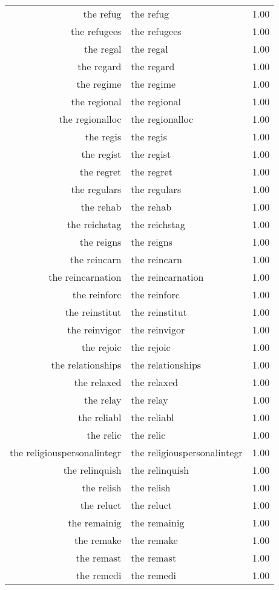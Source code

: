 \begin{table}[ht]
\begin{tabular}{rlr}
  the refug & the refug & 1.00 \\ 
  the refugees & the refugees & 1.00 \\ 
  the regal & the regal & 1.00 \\ 
  the regard & the regard & 1.00 \\ 
  the regime & the regime & 1.00 \\ 
  the regional & the regional & 1.00 \\ 
  the regionalloc & the regionalloc & 1.00 \\ 
  the regis & the regis & 1.00 \\ 
  the regist & the regist & 1.00 \\ 
  the regret & the regret & 1.00 \\ 
  the regulars & the regulars & 1.00 \\ 
  the rehab & the rehab & 1.00 \\ 
  the reichstag & the reichstag & 1.00 \\ 
  the reigns & the reigns & 1.00 \\ 
  the reincarn & the reincarn & 1.00 \\ 
  the reincarnation & the reincarnation & 1.00 \\ 
  the reinforc & the reinforc & 1.00 \\ 
  the reinstitut & the reinstitut & 1.00 \\ 
  the reinvigor & the reinvigor & 1.00 \\ 
  the rejoic & the rejoic & 1.00 \\ 
  the relationships & the relationships & 1.00 \\ 
  the relaxed & the relaxed & 1.00 \\ 
  the relay & the relay & 1.00 \\ 
  the reliabl & the reliabl & 1.00 \\ 
  the relic & the relic & 1.00 \\ 
  the religiouspersonalintegr & the religiouspersonalintegr & 1.00 \\ 
  the relinquish & the relinquish & 1.00 \\ 
  the relish & the relish & 1.00 \\ 
  the reluct & the reluct & 1.00 \\ 
  the remainig & the remainig & 1.00 \\ 
  the remake & the remake & 1.00 \\ 
  the remast & the remast & 1.00 \\ 
  the remedi & the remedi & 1.00 \\ 

\end{tabular}
\end{table}
